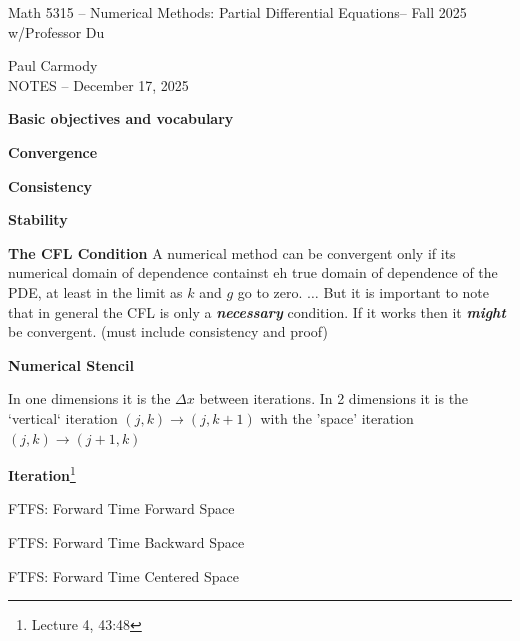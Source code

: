 \documentclass[10pt,a4paper]{report}
\newcommand{\CLASSNAME}{Math 5315 -- Numerical Methods: Partial Differential Equations}
\newcommand{\STUDENTNAME}{Paul Carmody}
\newcommand{\ASSIGNMENT}{NOTES }
\newcommand{\DUEDATE}{December 17, 2025}
\newcommand{\SEMESTER}{Fall 2025}
\begin{document}
\begin{center}
	\Large{\CLASSNAME -- \SEMESTER} \\
	\large{ w/Professor Du}
\end{center}
\begin{center}
	\STUDENTNAME \\
	\ASSIGNMENT -- \DUEDATE\\
\end{center} 

\textbf{\Large{Basic objectives and vocabulary}}

\begin{description}
	\item \textbf{Convergence}
	\item \textbf{Consistency}
	\item \textbf{Stability}
	
	\textbf{The CFL Condition} A numerical method can be convergent only if its numerical domain of dependence containst eh true domain of dependence of the PDE, at least in the limit as $k$ and $g$ go to zero. $\dots$ But it is important to note that in general the CFL is only a \textbf{\textit{necessary}} condition. If it works then it \textbf{\textit{might}} be convergent. (must include consistency and proof)
	
	\item \textbf{Numerical Stencil}
	
	In one dimensions it is the $\Delta x$ between iterations.  In 2 dimensions it is the `vertical` iteration $(j,k) \to (j,k+1)$ with the 'space' iteration $(j,k) \to (j+1,k)$

	\item \textbf{Iteration}\footnote{Lecture 4, 43:48}

	FTFS: Forward Time Forward Space

	FTFS: Forward Time Backward Space

	FTFS: Forward Time Centered Space
	

\end{description}
\end{document}
